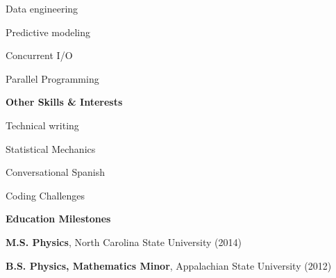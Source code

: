 \documentclass[letterpaper,final]{memoir}
\newcommand{\LargeSep}{\vspace{1.3em}}
\newcommand{\Sep}{\vspace{1.0em}}
\newcommand{\SmallSep}{\vspace{0.4em}}
\newcommand{\CVSection}[1]
	{\LARGE\textbf{#1}\par
	\SmallSep\normalsize}
\newcommand{\CVItem}[1]
	{\textbf{\color{Blue} #1}}
\begin{document}
\begin{multicols}{4}

    \begin{compactitem}[\color{Blue}$\circ$]

        \item Data engineering
        \SmallSep

        \item Predictive modeling
        \SmallSep
   
        \item Concurrent I/O
        \SmallSep

        \item Parallel Programming
        
	\end{compactitem}

\end{multicols}

\Sep
\CVItem{Other Skills \& Interests}
\SmallSep

\begin{multicols}{4}

    \begin{compactitem}[\color{Blue}$\circ$] 

        \item Technical writing
        \SmallSep

        \item Statistical Mechanics
        \SmallSep
    
        \item Conversational Spanish
        \SmallSep 

		\item Coding Challenges
	\end{compactitem}
\end{multicols}
\LargeSep


\notoserif \CVSection{Education Milestones}
\normalfont
\Sep
\begin{compactitem}[\color{Blue}$\circ$]

\item \textbf{M.S. Physics}, North Carolina State University (2014)
\SmallSep
\item \textbf{B.S. Physics, Mathematics Minor}, Appalachian State University (2012)

\end{compactitem}
\Sep
\end{document}
